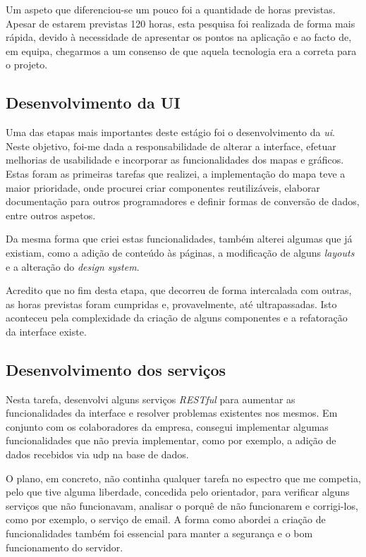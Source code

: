 Um aspeto que diferenciou-se um pouco foi a quantidade de horas previstas. Apesar de estarem previstas 120 horas, esta pesquisa foi realizada de forma mais rápida, devido à necessidade de apresentar os pontos na aplicação e ao facto de, em equipa, chegarmos a um consenso de que aquela tecnologia era a correta para o projeto.

\vspace{0.5cm}
\subsection{Desenvolvimento da UI}
Uma das etapas mais importantes deste estágio foi o desenvolvimento da \textit{\acs{ui}}. Neste objetivo, foi-me dada a responsabilidade de alterar a interface, efetuar melhorias de usabilidade e incorporar as funcionalidades dos mapas e gráficos. Estas foram as primeiras tarefas que realizei, a implementação do mapa teve a maior prioridade, onde procurei criar componentes reutilizáveis, elaborar documentação para outros programadores e definir formas de conversão de dados, entre outros aspetos.

Da mesma forma que criei estas funcionalidades, também alterei algumas que já existiam, como a adição de conteúdo às páginas, a modificação de alguns \textit{layouts} e a alteração do \textit{design system}.

Acredito que no fim desta etapa, que decorreu de forma intercalada com outras, as horas previstas foram cumpridas e, provavelmente, até ultrapassadas. Isto aconteceu pela complexidade da criação de alguns componentes e a refatoração da interface existe.

\vspace{0.5cm}
\subsection{Desenvolvimento dos serviços}
Nesta tarefa, desenvolvi alguns serviços \textit{RESTful} para aumentar as funcionalidades da interface e resolver problemas existentes nos mesmos. Em conjunto com os colaboradores da empresa, consegui implementar algumas funcionalidades que não previa implementar, como por exemplo, a adição de dados recebidos via \acs{udp} na base de dados.

O plano, em concreto, não continha qualquer tarefa no espectro que me competia, pelo que tive alguma liberdade, concedida pelo orientador, para verificar alguns serviços que não funcionavam, analisar o porquê de não funcionarem e corrigi-los, como por exemplo, o serviço de email. A forma como abordei a criação de funcionalidades também foi essencial para manter a segurança e o bom funcionamento do servidor.

